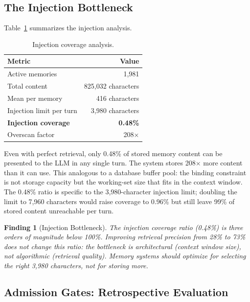 \documentclass{llncs}
\newtheorem{finding}{Finding}
\begin{document}
\subsection{The Injection Bottleneck}


Table~\ref{tab:injection} summarizes the injection analysis.

\begin{table}[h]
\centering
\caption{Injection coverage analysis.}
\label{tab:injection}
\begin{tabular}{lr}
\toprule
Metric & Value \\
\midrule
Active memories & 1,981 \\
Total content & 825,032 characters \\
Mean per memory & 416 characters \\
Injection limit per turn & 3,980 characters \\
\textbf{Injection coverage} & \textbf{0.48\%} \\
Overscan factor & 208$\times$ \\
\bottomrule
\end{tabular}
\end{table}

Even with perfect retrieval, only 0.48\% of stored memory content can be presented to the LLM in any single turn. The system stores 208$\times$ more content than it can use. This analogous to a database buffer pool: the binding constraint is not storage capacity but the working-set size that fits in the context window. The 0.48\% ratio is specific to the 3,980-character injection limit; doubling the limit to 7,960 characters would raise coverage to 0.96\% but still leave 99\% of stored content unreachable per turn.

\begin{finding}[Injection Bottleneck]
The injection coverage ratio (0.48\%) is three orders of magnitude below 100\%. Improving retrieval precision from 28\% to 73\% does not change this ratio: the bottleneck is architectural (context window size), not algorithmic (retrieval quality). Memory systems should optimize for \emph{selecting the right 3,980 characters}, not for storing more.
\end{finding}

\subsection{Admission Gates: Retrospective Evaluation}
\end{document}
